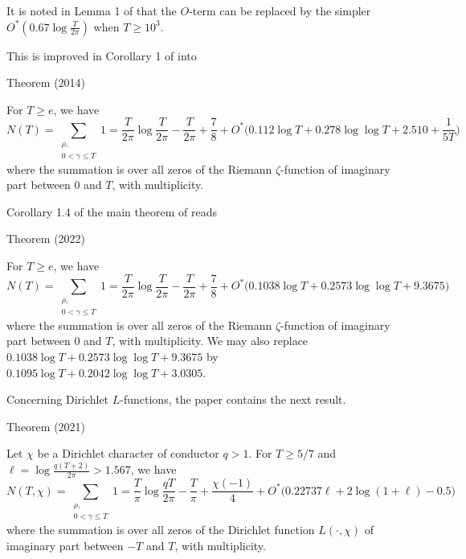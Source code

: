 It is noted in Lemma 1 of
\cite{Ramare-Saouter*02}
that the $O$-term can be replaced by the simpler
$O^*(0.67\log\frac{T}{2\pi})$ when $T\ge 10^3$.

This is improved in Corollary 1 of
\cite{Trudgian*13}
into
\begin{thm}{Theorem (2014)}

For $T\ge e$, we have
$$
N(T)=\sum_{\substack{\rho,\\ 0 < \gamma\le T}} 1=
            \frac{T}{2\pi}\log\frac{T}{2\pi}-\frac{T}{2\pi}+\frac{7}{8}
            +O^*\bigl(0.112\log T+0.278\log\log T+2.510+\frac{1}{5T}
            \bigr)
            $$
            where the summation is over all zeros of the Riemann
            $\zeta$-function of
            imaginary part between 0 and $T$, with multiplicity.
\end{thm}



Corollary 1.4 of the main theorem of
\cite{Hasanalizade-Shen-Wong*22}
reads
\begin{thm}{Theorem (2022)}

For $T\ge e$, we have
$$
N(T)=\sum_{\substack{\rho,\\ 0 < \gamma\le T}} 1=
            \frac{T}{2\pi}\log\frac{T}{2\pi}-\frac{T}{2\pi}+\frac{7}{8}
            +O^*\bigl(0.1038\log T+0.2573\log\log T+9.3675
            \bigr)
            $$
            where the summation is over all zeros of the Riemann
            $\zeta$-function of
				 imaginary part between 0 and $T$, with multiplicity.
				 We may also replace $0.1038\log
				 T+0.2573\log\log T+9.3675$ by $0.1095\log T+0.2042\log\log T+3.0305$.
\end{thm}



Concerning Dirichlet $L$-functions, the paper
\cite{Bennett-Martin-OBryant-Rechnitzer*21}
contains the next result.

\begin{thm}{Theorem (2021)}

    Let $\chi$ be a Dirichlet character of conductor $q > 1$.
For $T\ge 5/7$ and $\ell= \log\frac{q(T+2)}{2\pi} > 1.567$, we have
$$
N(T,\chi)=\sum_{\substack{\rho,\\ 0 < \gamma\le T}} 1=
            \frac{T}{\pi}\log\frac{qT}{2\pi}-\frac{T}{\pi}+\frac{\chi(-1)}{4}
            +O^*\bigl(0.22737\ell+2\log(1+\ell)-0.5
            \bigr)
            $$
            where the summation is over all zeros of the Dirichlet
            function $L(\cdot,\chi)$ of
				 imaginary part between $-T$ and $T$, with multiplicity.
				 
\end{thm}





